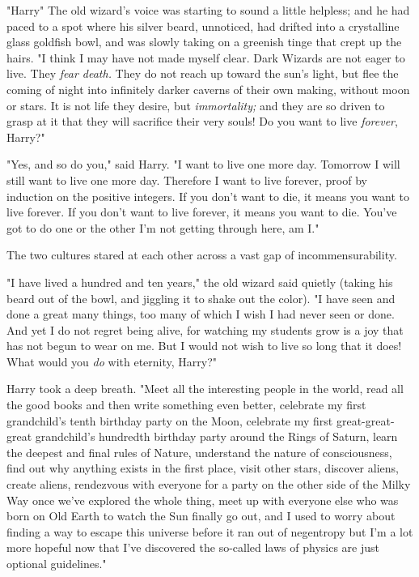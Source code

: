 "Harry{\el}" The old wizard's voice was starting to sound a little helpless;
and he had paced to a spot where his silver beard, unnoticed, had drifted into
a crystalline glass goldfish bowl, and was slowly taking on a greenish tinge
that crept up the hairs. "I think I may have not made myself clear. Dark
Wizards are not eager to live. They \emph{fear death.} They do not reach up
toward the sun's light, but flee the coming of night into infinitely darker
caverns of their own making, without moon or stars. It is not life they desire,
but \emph{immortality;} and they are so driven to grasp at it that they will
sacrifice their very souls! Do you want to live \emph{forever}, Harry?"

"Yes, and so do you," said Harry. "I want to live one more day. Tomorrow I will
still want to live one more day. Therefore I want to live forever, proof by
induction on the positive integers. If you don't want to die, it means you want
to live forever. If you don't want to live forever, it means you want to die.
You've got to do one or the other{\el} I'm not getting through here, am I."

The two cultures stared at each other across a vast gap of incommensurability.

"I have lived a hundred and ten years," the old wizard said quietly (taking his
beard out of the bowl, and jiggling it to shake out the color). "I have seen
and done a great many things, too many of which I wish I had never seen or
done. And yet I do not regret being alive, for watching my students grow is a
joy that has not begun to wear on me. But I would not wish to live so long that
it does! What would you \emph{do} with eternity, Harry?"

Harry took a deep breath. "Meet all the interesting people in the world, read
all the good books and then write something even better, celebrate my first
grandchild's tenth birthday party on the Moon, celebrate my first
great-great-great grandchild's hundredth birthday party around the Rings of
Saturn, learn the deepest and final rules of Nature, understand the nature of
consciousness, find out why anything exists in the first place, visit other
stars, discover aliens, create aliens, rendezvous with everyone for a party on
the other side of the Milky Way once we've explored the whole thing, meet up
with everyone else who was born on Old Earth to watch the Sun finally go out,
and I used to worry about finding a way to escape this universe before it ran
out of negentropy but I'm a lot more hopeful now that I've discovered the
so-called laws of physics are just optional guidelines."

